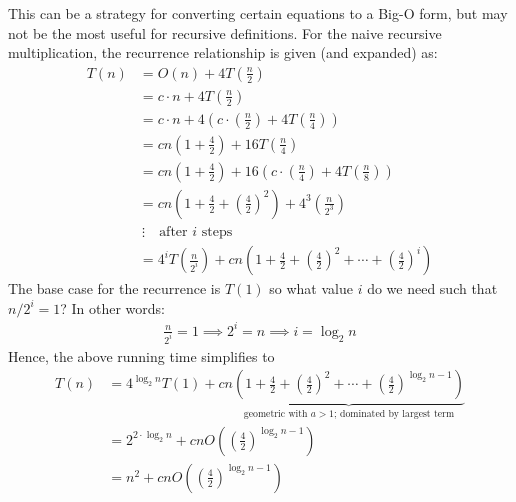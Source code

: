 \documentclass[14pt]{extarticle}
\begin{document}
    This can be a strategy for converting certain equations to a Big-O form,
    but may not be the most useful for recursive definitions. For the 
    naive recursive multiplication, the recurrence relationship is given
    (and expanded) as:
    \begin{align*}
        T(n) &= O(n) + 4T\left(\frac{n}{2}\right)           \\
             &= c\cdot n + 4T\left(\frac{n}{2}\right)       \\
             &= c\cdot n + 4\left(c\cdot \left(\frac{n}{2}
                \right) + 4T\left(\frac{n}{4}\right)\right) \\
             &= cn\left(1 + \frac{4}{2}\right)
                + 16T\left(\frac{n}{4}\right)               \\
             &= cn\left(1 + \frac{4}{2}\right)
                + 16\left(
                    c\cdot \left(\frac{n}{4}\right)
                     + 4T\left(\frac{n}{8}\right)
                \right)                                     \\
             &= cn\left(1 + \frac{4}{2} + \left(
                    \frac{4}{2}       
                 \right)^2 \right)
                + 4^3\left(\frac{n}{2^3}\right)             \\
            &\ \vdots\quad\text{after $i$ steps}            \\
            &= 4^i T\left(\frac{n}{2^i}\right)
            + cn\left(1 + \frac{4}{2} 
                + \left(\frac{4}{2}\right)^2 
                + \cdots  
                + \left(\frac{4}{2}\right)^i\right)
    \end{align*}
    The base case for the recurrence is $T(1)$ so what value $i$ do we need
    such that $n / 2^i = 1$? In other words:
    \begin{align*}
        \frac{n}{2^i} = 1\implies 2^i = n\implies i = \log_2 n
    \end{align*}
    Hence, the above running time simplifies to
    \begin{align*}
        T(n) &= 4^{\log_2 n} T(1) + cn
            \underbrace{
                \left(1 + \frac{4}{2} + \left(\frac{4}{2}\right)^2
            + \cdots + \left(\frac{4}{2}\right)^{\log_2 n - 1}\right)}
            _{\text{geometric with $a > 1$; dominated by largest term}}
                                                                    \\
        &= 2^{2\cdot \log_2 n} + cn
            O\left(\left(\frac{4}{2}\right)^{\log_2 n - 1}\right)   \\
        &= n^2 + cn
            O\left(\left(\frac{4}{2}\right)^{\log_2 n - 1}\right)   \\
    \end{align*}
\end{document}
